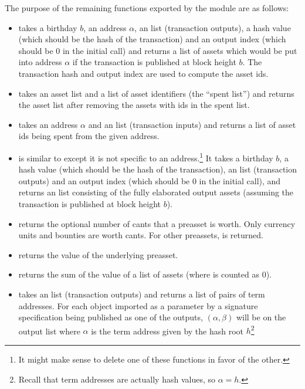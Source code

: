 The purpose of the remaining functions exported by the {} module are as follows:
\begin{itemize}
\item {} takes a birthday $b$, an address $\alpha$,
an {} list (transaction outputs), a hash value (which should
be the hash of the transaction)
and an output index (which should be $0$ in the initial call)
and returns a list of assets which would be put into address $\alpha$
if the transaction is published at block height $b$.
The transaction hash and output index are used to compute the asset ids.
\item {} takes an asset list and a list of asset identifiers (the ``spent list'') and
returns the asset list after removing the assets with ids in the spent list.
\item {} takes an address $\alpha$ and an {} list (transaction inputs)
and returns a list of asset ids being spent from the given address.
\item {} is similar to {} except it is not specific to an address.\footnote{It might make sense to delete one of these functions in favor of the other.}
It takes a birthday $b$, a hash value (which should be the hash of the transaction),
an {} list (transaction outputs)
and an output index (which should be $0$ in the initial call),
and returns an {} list consisting of the fully elaborated output assets
(assuming the transaction is published at block height $b$).
\item {} returns the optional number of cants that a preasset is worth.
Only currency units and bounties are worth cants. For other preassets, {} is returned.
\item {} returns the value of the underlying preasset.
\item {} returns the sum of the value of a list of assets (where {} is counted as $0$).
\item {} takes
an {} list (transaction outputs)
and returns a list of pairs of term addresses.
For each object imported as a parameter by a signature specification being published as one of the outputs,
$(\alpha,\beta)$ will be on the output list
where $\alpha$ is the term address given by the hash root $h$\footnote{Recall that term addresses are actually hash values, so $\alpha = h$.}

\end{itemize}
